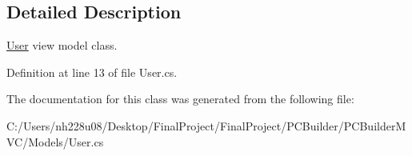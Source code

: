 \subsection{Detailed Description}
\hyperlink{class_p_c_builder_m_v_c_1_1_models_1_1_user}{User} view model class. 



Definition at line 13 of file User.\+cs.



The documentation for this class was generated from the following file\+:\begin{DoxyCompactItemize}
\item 
C\+:/\+Users/nh228u08/\+Desktop/\+Final\+Project/\+Final\+Project/\+P\+C\+Builder/\+P\+C\+Builder\+M\+V\+C/\+Models/User.\+cs\end{DoxyCompactItemize}
